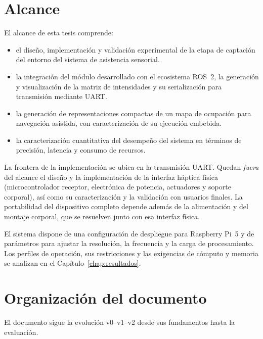 \section{Alcance}
\label{sec:intro-alcance}

El alcance de esta tesis comprende:
\begin{itemize}
  \item el diseño, implementación y validación experimental de la etapa de captación del entorno
        del sistema de asistencia sensorial.
  \item la integración del módulo desarrollado con el ecosistema ROS~2, la generación y
        visualización de la matriz de intensidades y su serialización para transmisión mediante
        UART.
  \item la generación de representaciones compactas de un mapa de ocupación para navegación
        asistida, con caracterización de su ejecución embebida.
  \item la caracterización cuantitativa del desempeño del sistema en términos de precisión, latencia
        y consumo de recursos.
\end{itemize}

La frontera de la implementación se ubica en la transmisión UART. Quedan \emph{fuera} del alcance
el diseño y la implementación de la interfaz háptica física (microcontrolador receptor, electrónica
de potencia, actuadores y soporte corporal), así como su caracterización y la validación con
usuarios finales. La portabilidad del dispositivo completo depende además de la alimentación y del
montaje corporal, que se resuelven junto con esa interfaz física.

El sistema dispone de una configuración de despliegue para Raspberry Pi~5 y de parámetros para
ajustar la resolución, la frecuencia y la carga de procesamiento. Los perfiles de operación, sus
restricciones y las exigencias de cómputo y memoria se analizan en el
Capítulo~\ref{chap:resultados}.

\section{Organización del documento}


El documento sigue la evolución v0--v1--v2 desde sus fundamentos hasta la evaluación.

